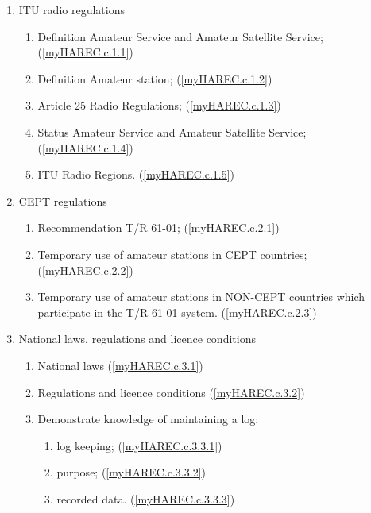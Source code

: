 \begin{enumerate}

\item ITU radio regulations
\begin{enumerate}
\item Definition Amateur Service and Amateur Satellite Service;
  (\ref{myHAREC.c.1.1})\label{HAREC.c.1.1}
\item Definition Amateur station;
  (\ref{myHAREC.c.1.2})\label{HAREC.c.1.2}
\item Article 25 Radio Regulations;
  (\ref{myHAREC.c.1.3})\label{HAREC.c.1.3}
\item Status Amateur Service and Amateur Satellite Service;
  (\ref{myHAREC.c.1.4})\label{HAREC.c.1.4}
\item ITU Radio Regions.
  (\ref{myHAREC.c.1.5})\label{HAREC.c.1.5}
\end{enumerate}

\item CEPT regulations
\begin{enumerate}
\item Recommendation T/R 61-01;
  (\ref{myHAREC.c.2.1})\label{HAREC.c.2.1}
\item Temporary use of amateur stations in CEPT countries;
  (\ref{myHAREC.c.2.2})\label{HAREC.c.2.2}
\item Temporary use of amateur stations in NON-CEPT countries which participate
  in the T/R 61-01 system. (\ref{myHAREC.c.2.3})\label{HAREC.c.2.3}
\end{enumerate}

\item National laws, regulations and licence conditions
\begin{enumerate}
\item National laws
  (\ref{myHAREC.c.3.1})\label{HAREC.c.3.1}
\item Regulations and licence conditions
  (\ref{myHAREC.c.3.2})\label{HAREC.c.3.2}
\item Demonstrate knowledge of maintaining a log:
\begin{enumerate}
\item log keeping; (\ref{myHAREC.c.3.3.1})\label{HAREC.c.3.3.1}
\item purpose; (\ref{myHAREC.c.3.3.2})\label{HAREC.c.3.3.2}
\item recorded data. (\ref{myHAREC.c.3.3.3})\label{HAREC.c.3.3.3}
\end{enumerate}
\end{enumerate}
\end{enumerate}
